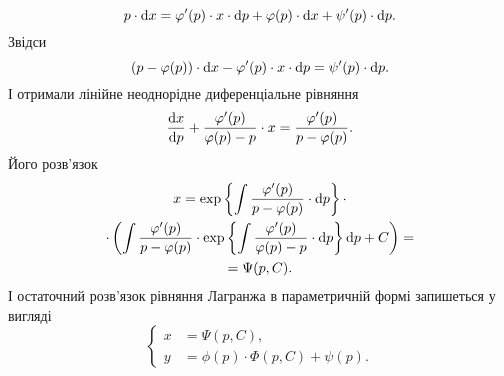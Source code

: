 \begin{enumerate}
	\begin{equation}
		\label{eq:1.5.18}
		p \cdot \mathop{}\!\mathrm{d} x = \varphi'(p) \cdot x \cdot \mathop{}\!\mathrm{d} p + \varphi(p) \cdot \mathop{}\!\mathrm{d} x + \psi'(p) \cdot \mathop{}\!\mathrm{d} p.
	\end{equation}
	Звідси
	\begin{equation}
		\label{eq:1.5.19}
		(p - \varphi(p)) \cdot \mathop{}\!\mathrm{d} x - \varphi'(p) \cdot x \cdot \mathop{}\!\mathrm{d} p = \psi'(p) \cdot \mathop{}\!\mathrm{d} p.
	\end{equation}
	І отримали лінійне неоднорідне диференціальне рівняння
	\begin{equation}
		\label{eq:1.5.20}
		\frac{\mathop{}\!\mathrm{d} x}{\mathop{}\!\mathrm{d} p} + \frac{\varphi'(p)}{\varphi(p)-p} \cdot x = \frac{\varphi'(p)}{p-\varphi(p)}.
	\end{equation}
	Його розв’язок
	\begin{multline}
		\label{eq:1.5.21}
		x = \exp\left\{\int \frac{\varphi'(p)}{p-\varphi(p)} \cdot \mathop{}\!\mathrm{d} p\right\} \cdot \\
		\cdot \left(\int \frac{\varphi'(p)}{p-\varphi(p)} \cdot \exp\left\{\int \frac{\varphi'(p)}{\varphi(p)-p} \cdot \mathop{}\!\mathrm{d} p\right\} \mathop{}\!\mathrm{d} p + C \right) = \\
		= \Psi(p, C).
	\end{multline}
	І остаточний розв’язок рівняння Лагранжа в параметричній формі запишеться у вигляді
	\begin{equation}
		\label{eq:1.5.22}
		\left\{\begin{aligned}
			x &= \Psi(p,C), \\
			y &= \phi(p) \cdot \Phi(p, C) + \psi(p).
		\end{aligned}\right.
	\end{equation}
\end{enumerate}
